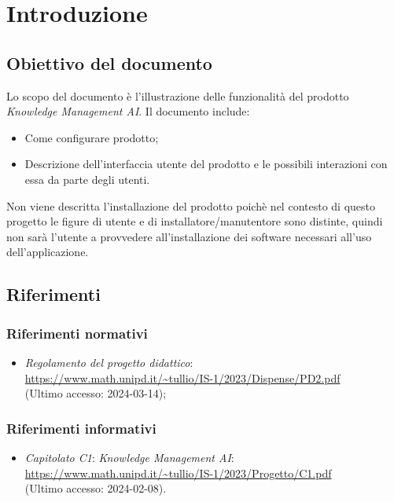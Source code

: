 \documentclass[10pt, a4paper]{article}
\title{\titolo}
\author{SWEetCode}
\begin{document}



\newpage

\tableofcontents
\newpage

\listoffigures
\newpage
\section{Introduzione}
\subsection{Obiettivo del documento}
Lo scopo del documento è l'illustrazione delle funzionalità del prodotto \textit{Knowledge Management AI}. Il documento include: 
\begin{itemize}
    \item Come configurare prodotto;
    \item Descrizione dell'interfaccia utente del prodotto e le possibili interazioni con essa da parte degli utenti.
\end{itemize} 
Non viene descritta l'installazione del prodotto poichè nel contesto di questo progetto le figure di utente e di installatore/manutentore sono distinte, quindi non sarà l'utente a provvedere all'installazione dei software necessari all'uso dell'applicazione.


\subsection{Riferimenti}
\subsubsection{Riferimenti normativi}
\begin{itemize}
    \item \textit{Regolamento del progetto didattico}: \\
        \url{https://www.math.unipd.it/~tullio/IS-1/2023/Dispense/PD2.pdf}\\
        (Ultimo accesso: 2024-03-14);
    \end{itemize}
\subsubsection{Riferimenti informativi}
\begin{itemize}
        \item \textit{Capitolato C1}: \textit{Knowledge Management AI}: \\ \url{https://www.math.unipd.it/~tullio/IS-1/2023/Progetto/C1.pdf}\\
        (Ultimo accesso: 2024-02-08).
        \end{itemize}
\end{document}
